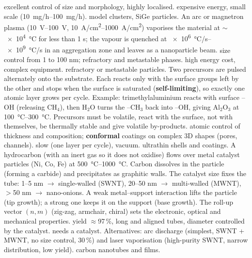 {excellent control of size and morphology, highly localised.}
{expensive energy, small scale (\SIrange{10}{100}{mg/h}).}
{model clusters, SiGe particles.}
{An arc or magnetron plasma (\SIrange{10}{100}{V}, \SIrange{10}{1000}{A/cm^2}) vaporises the material at $\sim$\SI{e4}{\celsius} for
less than 1 s; the vapour is quenched at \SIrange{e6}{e9}{\celsius/s} in an aggregation zone and leaves as a nanoparticle beam.}
{size control from 1 to 100 nm; refractory and metastable phases.}
{high energy cost, complex equipment.}
{refractory or metastable particles.}
{Two precursors are pulsed alternately onto the substrate. Each reacts only with the surface groups left by the other and stops when
the surface is saturated (\textbf{self-limiting}), so exactly one atomic layer grows per cycle. Example: trimethylaluminium reacts with
surface --OH (releasing CH$_4$), then H$_2$O turns the --CH$_3$ back into --OH, giving Al$_2$O$_3$ at \SIrange{100}{300}{\celsius}.
Precursors must be volatile, react with the surface, not with themselves, be thermally stable and give volatile by-products.}
{atomic control of thickness and composition; \textbf{conformal} coatings on complex 3D shapes (pores, channels).}
{slow (one layer per cycle), vacuum.}
{ultrathin shells and coatings.}
{A hydrocarbon (with an inert gas so it does not oxidise) flows over metal catalyst particles (Ni, Co, Fe) at
\SIrange{500}{1000}{\celsius}. Carbon dissolves in the particle (forming a carbide) and precipitates as graphitic walls. The catalyst
size fixes the tube: 1--5 nm $\to$ single-walled (SWNT), 20--50 nm $\to$ multi-walled (MWNT), $>$50 nm $\to$ nano-onions. A weak
metal--support interaction lifts the particle (tip growth); a strong one keeps it on the support (base growth). The roll-up
vector $(n,m)$ (zig-zag, armchair, chiral) sets the electronic, optical and mechanical properties.}
{yield $\approx$97\,\%, long and aligned tubes, diameter controlled by the catalyst.}
{needs a catalyst. Alternatives: arc discharge (simplest, SWNT + MWNT, no size control, 30\,\%) and laser vaporisation
(high-purity SWNT, narrow distribution, low yield).}
{carbon nanotubes and films.}

